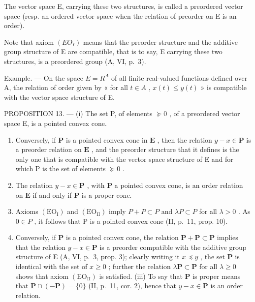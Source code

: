 The vector space E, carrying these two structures, is called a preordered vector space (resp. an ordered vector space when the relation of preorder on E is an order).

Note that axiom \((EO_{I})\) means that the preorder structure and the additive group structure of E are compatible, that is to say, E carrying these two structures, is a preordered group (A, VI, p.~3).

Example. --- On the space \(E = R^{A}\) of all finite real-valued functions defined over A, the relation of order given by « for all \(t \in A\) , \(x(t) \leqslant y(t)\) » is compatible with the vector space structure of E.

PROPOSITION 13. --- (i) The set P, of elements \(\succcurlyeq 0\) , of a preordered vector space E, is a pointed convex cone.

\begin{enumerate}
\def\labelenumi{(\roman{enumi})}
\setcounter{enumi}{1}
\item
  Conversely, if \(\mathbf{P}\) is a pointed convex cone in \(\mathbf{E}\) , then the relation \(y - x \in \mathbf{P}\) is a preorder relation on \(\mathbf{E}\) , and the preorder structure that it defines is the only one that is compatible with the vector space structure of E and for which P is the set of elements \(\succcurlyeq 0\) .
\item
  The relation \(y - x \in \mathbf{P}\) , with \(\mathbf{P}\) a pointed convex cone, is an order relation on \(\mathbf{E}\) if and only if \(\mathbf{P}\) is a proper cone.
\item
  Axioms \((\mathrm{EO}_{\mathrm{I}})\) and \((\mathrm{EO}_{\mathrm{II}})\) imply \(P + P \subset P\) and \(\lambda P \subset P\) for all \(\lambda > 0\) . As \(0 \in P\) , it follows that P is a pointed convex cone (II, p.~11, prop. 10).
\item
  Conversely, if \(\mathbf{P}\) is a pointed convex cone, the relation \(\mathbf{P} + \mathbf{P} \subset \mathbf{P}\) implies that the relation \(y - x \in \mathbf{P}\) is a preorder compatible with the additive group structure of E (A, VI, p.~3, prop. 3); clearly writing it \(x \preccurlyeq y\) , the set \(\mathbf{P}\) is identical with the set of \(x \geqslant 0\) ; further the relation \(\lambda \mathbf{P} \subset \mathbf{P}\) for all \(\lambda \geqslant 0\) shows that axiom \((\mathrm{EO}_{\mathrm{II}})\) is satisfied. (iii) To say that \(\mathbf{P}\) is proper means that \(\mathbf{P} \cap (-\mathbf{P}) = \{0\}\) (II, p.~11, cor. 2), hence that \(y - x \in \mathbf{P}\) is an order relation.
\end{enumerate}

